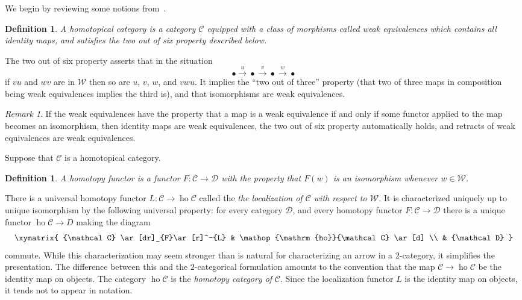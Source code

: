\documentclass{amsart}
\newtheorem{definition}[equation]{Definition}
\newenvironment{defin}{\begin{definition}\rm}{\end{definition}}
\newtheorem{rem}[equation]{Remark}
\theoremstyle{definition}
\newtheorem{defin}[equation]{Definition}
\theoremstyle{remark}
\newtheorem{rem}[equation]{Remark}
\DeclareMathOperator{\ho}{ho}
\newcommand{\cat}[1]{{\mathcal #1}}
\newcommand{\weq}{\mathcal W}
\begin{document}
We begin by reviewing some notions from~\cite{dwyer04:_homot}.

\begin{defin}
\label{def:7}
A {\em homotopical category} is a category $\cat C$ equipped with a
class of morphisms called {\em weak equivalences} which contains all
identity maps, and satisfies the {\em
two out of six property} described below.
\end{defin}
The two out of six property asserts that in the situation 
\[
\bullet \xrightarrow{u} \bullet \xrightarrow{v} \bullet
\xrightarrow{w} \bullet
\]
if $v u$ and $w v$ are in $\mathcal W$ then so are $u$, $v$, $w$, and
$v w u$.  It implies the ``two out of three'' property (that two of
three maps in composition being weak equivalences implies the third
is), and that isomorphisms are weak equivalences.

\begin{rem}
\label{rem:62} If the weak equivalences have the property that a map
is a weak equivalence if and only if some functor applied to the map
becomes an isomorphism, then identity maps are weak equivalences, the
two out of six property automatically holds, and retracts of weak
equivalences are weak equivalences.
\end{rem}


Suppose that $\cat C$ is a homotopical category.
\begin{defin}
\label{def:55}
A {\em homotopy functor} is a functor $F:\cat C\to \cat D$ with the
property that $F(w)$ is an isomorphism whenever $w\in\weq$.   
\end{defin}

There is a universal homotopy functor $L:\cat C\to \ho\cat C$ called
the {\em the localization of $\cat C$ with respect to $\weq$.}  It is
characterized uniquely up to unique isomorphism by the following
universal property: for every category $\cat D$, and every homotopy
functor $F:\cat C\to \cat D$ there is a unique functor $\ho\cat C\to
D$ making the diagram
\[
\xymatrix{
\cat C \ar[dr]_{F}\ar[r]^-{L} & \ho\cat C \ar[d] \\
& \cat D 
}
\]
commute.  While this characterization may seem stronger than is
natural for characterizing an arrow in a $2$-category, it simplifies
the presentation.  The difference between this and the $2$-categorical
formulation amounts to the convention that the map $\cat C\to \ho\cat
C$ be the identity map on objects.  The category $\ho\cat C$ is the
{\em homotopy category of} $\cat C$.  Since the localization functor
$L$ is the identity map on objects, it tends not to appear in
notation.
\end{document}
